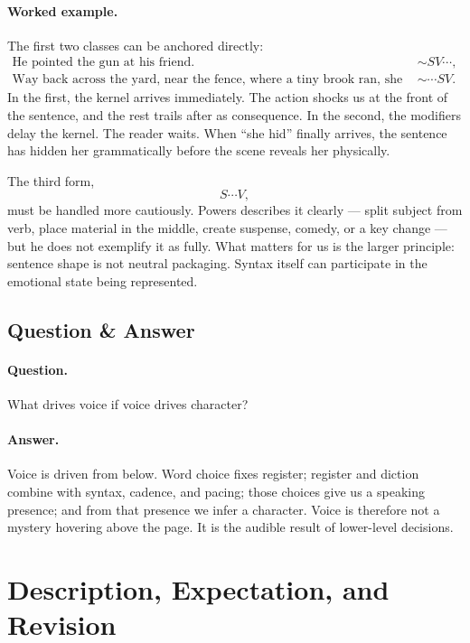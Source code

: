 \paragraph{Worked example.} The first two classes can be anchored directly:
\begin{align}
\text{He pointed the gun at his friend.} &\sim SV\cdots,\\
\text{Way back across the yard, near the fence, where a tiny brook ran, she hid.} &\sim \cdots SV.
\end{align}
In the first, the kernel arrives immediately. The action shocks us at the front of the sentence, and the rest trails after as consequence. In the second, the modifiers delay the kernel. The reader waits. When ``she hid'' finally arrives, the sentence has hidden her grammatically before the scene reveals her physically.

The third form,
\[
S\cdots V,
\]
must be handled more cautiously. Powers describes it clearly --- split subject from verb, place material in the middle, create suspense, comedy, or a key change --- but he does not exemplify it as fully. What matters for us is the larger principle: sentence shape is not neutral packaging. Syntax itself can participate in the emotional state being represented.

\subsection{Question \& Answer}

\paragraph{Question.} What drives voice if voice drives character?

\paragraph{Answer.} Voice is driven from below. Word choice fixes register; register and diction combine with syntax, cadence, and pacing; those choices give us a speaking presence; and from that presence we infer a character. Voice is therefore not a mystery hovering above the page. It is the audible result of lower-level decisions.

\section{Description, Expectation, and Revision}


